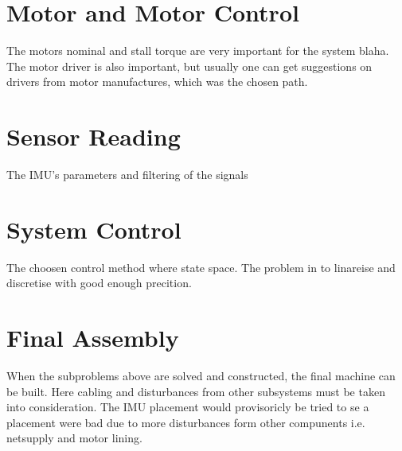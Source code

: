 \documentclass[a4paper,11pt]{kth-mag}
\begin{document}
\section{Motor and Motor Control}
The motors nominal and stall torque are very important for the system blaha. The motor driver is also important, but usually one can get suggestions on drivers from motor manufactures, which was the chosen path.
  
\section{Sensor Reading}
The IMU's parameters and filtering of the signals

\section{System Control}
The choosen control method where state space. The problem in to linareise and discretise with good enough precition.

\section{Final Assembly}
When the subproblems above are solved and constructed, the final machine can be built. Here cabling and disturbances from other subsystems must be taken into consideration. 
The IMU placement would provisoricly be tried to se a placement were bad due to more disturbances form other compunents i.e. netsupply and motor lining.
\end{document}
